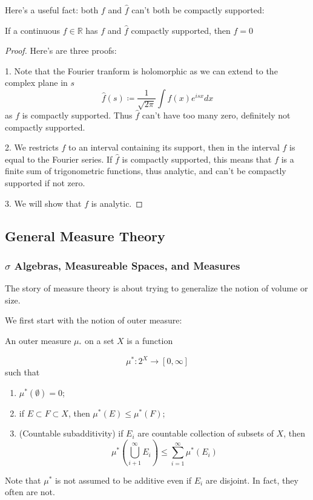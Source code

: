 \documentclass[main.tex]{subfiles}
\begin{document}
Here's a useful fact: both $f$ and $\hat{f}$ can't both be compactly supported:

\begin{theorem}
If a continuous $f \in \mathbb{R}$ has $f$ and $\hat{f}$ compactly supported, then $f = 0$
\end{theorem}

\begin{proof}
Here's are three proofs:

1. Note that the Fourier tranform is holomorphic as we can extend to the complex plane in $s$
$$
\hat{f}(s) \coloneqq \frac{1}{\sqrt{2\pi}} \int f(x) e^{isx} dx
$$
as $f$ is compactly supported. Thus $\hat{f}$ can't have too many zero, definitely not compactly supported.

2. We restricts $f$ to an interval containing its support, then in the interval $f$ is equal to the Fourier series. If $\hat{f}$ is compactly supported, this means that $f$ is a finite sum of trigonometric functions, thus analytic, and can't be compactly supported if not zero.

3. We will show that $f$ is analytic. 
\end{proof}



\subsection{General Measure Theory}

\subsubsection{$\sigma$ Algebras, Measureable Spaces, and Measures}
The story of measure theory is about trying to generalize the notion of volume or size. 

We first start with the notion of outer measure:

\begin{definition}
An outer measure $\mu_^*$ on a set $X$ is a function 

$$
\mu^* : 2^X \rightarrow [0, \infty]
$$ 
such that 
\begin{enumerate}
    \item $\mu^*(\emptyset) = 0$;
    \item if $E \subset F \subset X$, then $\mu^*(E) \leq \mu^*(F)$;
    \item (Countable subadditivity) if $E_i$ are countable collection of subsets of $X$, then 
    $$
    \mu^*(\bigcup_{i + 1} ^{\infty} E_i)\leq \sum_{i = 1} ^{\infty} \mu^*(E_i)
    $$
\end{enumerate}
\end{definition}
Note that $\mu^*$ is not assumed to be additive even if ${E_i}$ are disjoint. In fact, they often are not.
\end{document}
